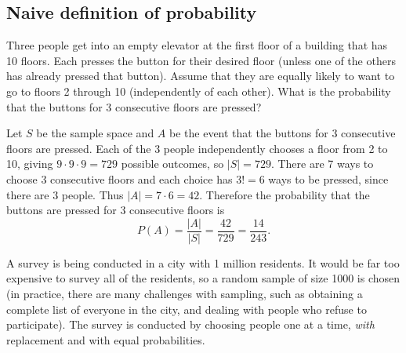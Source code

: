 {    \subsection{Naive definition of probability}
    \item%
    Three people get into an empty elevator at the first floor of a building that has 10 floors. 
    Each presses the button for their desired floor (unless one of the others has already pressed that button). 
    Assume that they are equally likely to want to go to floors 2 through 10 (independently of each other). 
    What is the probability that the buttons for 3 consecutive floors are pressed? 
    \begin{solution}
        Let $S$ be the sample space and $A$ be the event that the buttons for 3 consecutive floors are pressed. 
        Each of the 3 people independently chooses a floor from 2 to 10, giving $9 \cdot 9 \cdot 9 = 729$ possible outcomes, so $|S| = 729$. 
        There are 7 ways to choose 3 consecutive floors and each choice has $3! = 6$ ways to be pressed, since there are 3 people. 
        Thus $|A| = 7 \cdot 6 = 42$. 
        Therefore the probability that the buttons are pressed for 3 consecutive floors is 
        \begin{equation*}
            P(A) = \frac{|A|}{|S|} = \frac{42}{729} = \frac{14}{243}. 
        \end{equation*}
    \end{solution}
    \item%
    \item%
    \item%
    A survey is being conducted in a city with 1 million residents. 
    It would be far too expensive to survey all of the residents, so a random sample of size 1000 is chosen (in practice, there are many challenges with sampling, such as obtaining a complete list of everyone in the city, and dealing with people who refuse to participate). 
    The survey is conducted by choosing people one at a time, \textit{with} replacement and with equal probabilities. 
    \begin{solution}
\end{solution}}
